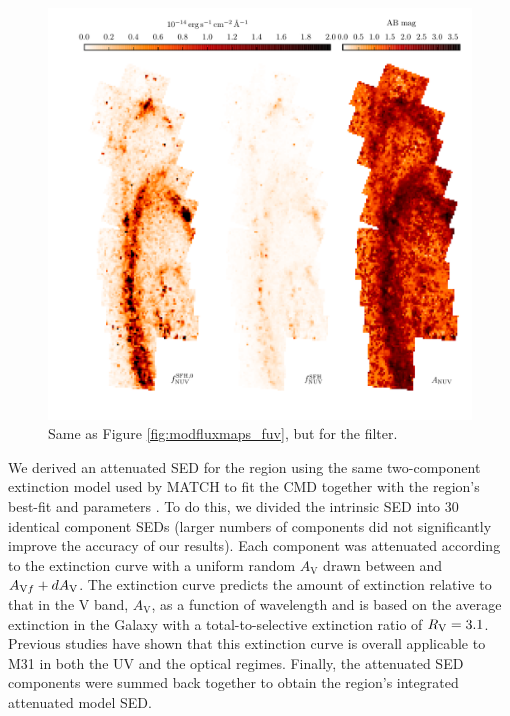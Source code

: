 \documentclass[iop, tighten]{emulateapj}
\begin{document}
\begin{figure}
\centering
\includegraphics[width=\textwidth]{m31flux-figures/modfluxmaps_nuv.pdf}
\caption[\nuv{} flux map modeled from the .]{Same as Figure
    \ref{fig:modfluxmaps_fuv}, but for the \nuv{} filter.
}
\label{fig:modfluxmaps_nuv}
\end{figure}


We derived an attenuated SED for the region using the same two-component
extinction model used by MATCH to fit the CMD together with the region's
best-fit \avf{} and \dav{} parameters \citep{Lewis:2014}. To do this, we
divided the intrinsic SED into 30 identical component SEDs (larger numbers of
components did not significantly improve the accuracy of our results). Each
component was attenuated according to the \citet{Cardelli:1989} extinction
curve with a uniform random $A_\mathrm{V}$ drawn between \avf{} and $A_{\mathrm{V}f} +
dA_\mathrm{V}$. The \citet{Cardelli:1989} extinction curve predicts the amount of
extinction relative to that in the V band, $A_\mathrm{V}$, as a function of
wavelength and is based on the average extinction in the Galaxy with a
total-to-selective extinction ratio of $R_\mathrm{V} = 3.1$. Previous studies have shown
that this extinction curve is overall applicable to M31 in both the UV
\citep{Bianchi:1996} and the optical \citep{Barmby:2000} regimes. Finally, the
attenuated SED components were summed back together to obtain the region's
integrated attenuated model SED.
\end{document}

